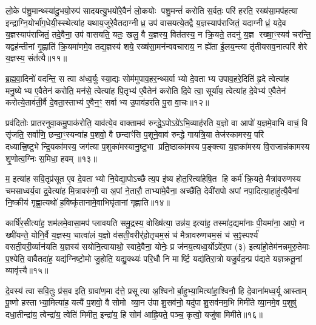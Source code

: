लो॒के प॑शु॒मान्थ्स्या॑दु॒भयो॒रुप॑ सादयत्यु॒भयो॑रे॒वैनं॑ लो॒कयोः पशु॒मन्तं॑ करोति स॒र्वतः॒ परि॑ हरति॒ रख्ष॑सा॒मप॑हत्या इन्द्राग्नि॒योर्भा॑ग॒धेयी॒स्स्थेत्या॑ह यथाय॒जुरे॒वैतदाग्नीध्र॒ उप॑ वासयत्ये॒तद्वै य॒ज्ञस्याप॑राजितं॒ यदाग्नीध्रं॒ यदे॒व य॒ज्ञस्याप॑राजितं॒ तदे॒वैना॒ उप॑ वासयति॒ यतः॒ खलु॒ वै य॒ज्ञस्य॒ वित॑तस्य॒ न क्रि॒यते॒ तदनु॑ य॒ज्ञ रख्षा॒ꣳ॒स्यव॑ चरन्ति॒ यद्वह॑न्तीनां गृ॒ह्णाति॑ क्रि॒यमा॑णमे॒व तद्य॒ज्ञस्य॑ शये॒ रख्ष॑सा॒मन॑न्ववचाराय॒ न ह्ये॑ता ई॒लय॒न्त्या तृ॑तीयसव॒नात्परि॑ शेरे य॒ज्ञस्य॒ संत॑त्यै॥११॥

{\anuvakamend[{स्या॒दिन्द्रो॑ गृह्णी॒याद॑स्त्व॒मुष्मि॑न्क्रि॒यते॒ षड्विꣳ॑शतिश्च॥२॥}]}

ब्र॒ह्म॒वा॒दिनो॑ वदन्ति॒ स त्वा अ॑ध्व॒र्युः स्या॒द्यः सोम॑मुपाव॒हर॒न्थ्सर्वाभ्यो दे॒वताभ्य उपाव॒हरे॒दिति॑ हृ॒दे त्वेत्या॑ह मनु॒ष्येभ्य ए॒वैतेन॑ करोति॒ मन॑से॒ त्वेत्या॑ह पि॒तृभ्य॑ ए॒वैतेन॑ करोति दि॒वे त्वा॒ सूर्या॑य॒ त्वेत्या॑ह दे॒वेभ्य॑ ए॒वैतेन॑ करोत्ये॒ताव॑ती॒र्वै दे॒वता॒स्ताभ्य॑ ए॒वैन॒ꣳ॒ सर्वाभ्य उ॒पाव॑हरति पु॒रा वा॒चः॥१२॥

प्रव॑दितोः प्रातरनुवा॒कमु॒पाक॑रोति॒ याव॑त्ये॒व वाक्तामव॑ रुन्द्धे॒ऽपोऽग्रे॑ऽभि॒व्याह॑रति य॒ज्ञो वा आपो॑ य॒ज्ञमे॒वाभि वाचं॒ वि सृ॑जति॒ सर्वा॑णि॒ छन्दा॒ꣳ॒स्यन्वा॑ह प॒शवो॒ वै छन्दाꣳ॑सि प॒शूने॒वाव॑ रुन्द्धे गायत्रि॒या तेज॑स्कामस्य॒ परि॑ दध्यात्त्रि॒ष्टुभेन्द्रि॒यका॑मस्य॒ जग॑त्या प॒शुका॑मस्यानु॒ष्टुभा प्रति॒ष्ठाका॑मस्य प॒ङ्क्त्या य॒ज्ञका॑मस्य वि॒राजान्न॑कामस्य शृ॒णोत्व॒ग्निः स॒मिधा॒ हवम्॥१३॥

म॒ इत्या॑ह सवि॒तृप्र॑सूत ए॒व दे॒वताभ्यो नि॒वेद्या॒पोऽच्छैत्य॒प इ॑ष्य होत॒रित्या॑हेषि॒त हि कर्म॑ क्रि॒यते॒ मैत्रा॑वरुणस्य चमसाध्वर्य॒वा द्र॒वेत्या॑ह मि॒त्रावरु॑णौ॒ वा अ॒पां ने॒तारौ॒ ताभ्या॑मे॒वैना॒ अच्छै॑ति॒ देवी॑रापो अपां नपा॒दित्या॒हाहु॑त्यै॒वैना॑ नि॒ष्क्रीय॑ गृह्णा॒त्यथो॑ ह॒विष्कृ॑तानामे॒वाभिघृ॑तानां गृह्णाति॥१४॥

कार्\mbox{}षि॑र॒सीत्या॑ह॒ शम॑लमे॒वासा॒मप॑ प्लावयति समु॒द्रस्य॒ वोख्षि॑त्या॒ उन्न॑य॒ इत्या॑ह॒ तस्मा॑द॒द्यमा॑नाः पी॒यमा॑ना॒ आपो॒ न ख्षी॑यन्ते॒ योनि॒र्वै य॒ज्ञस्य॒ चात्वा॑लं य॒ज्ञो व॑सती॒वरीर्\mbox{}॑होतृचम॒सं च॑ मैत्रावरुणचम॒सं च॑ स॒ꣵ॒स्पर्श्य॑ वसती॒वरी॒र्व्यान॑यति य॒ज्ञस्य॑ सयोनि॒त्वायाथो॒ स्वादे॒वैना॒ योनेः॒ प्र ज॑नय॒त्यध्व॒र्योऽवे॑र॒पा (३) इत्या॑हो॒तेम॑नन्नमुरु॒तेमाः प॒श्येति॒ वावैतदा॑ह॒ यद्य॑ग्निष्टो॒मो जु॒होति॒ यद्यु॒क्थ्यः॑ परि॒धौ नि मार्ष्टि॒ यद्य॑तिरा॒त्रो यजु॒र्वद॒न्प्र प॑द्यते यज्ञक्रतू॒नां व्यावृ॑त्त्यै॥१५॥

{\anuvakamend[{वा॒चो हव॑म॒भिघृ॑तानां गृह्णात्यु॒त पञ्च॑विशतिश्च॥३॥}]}

दे॒वस्य॑ त्वा सवि॒तुः प्र॑स॒व इति॒ ग्रावा॑ण॒मा द॑त्ते॒ प्रसूत्या अ॒श्विनोर्बा॒हुभ्या॒मित्या॑हा॒श्विनौ॒ हि दे॒वाना॑मध्व॒र्यू आस्ताम् पू॒ष्णो हस्ताभ्या॒मित्या॑ह॒ यत्यै॑ प॒शवो॒ वै सोमो व्या॒न उ॑पाशु॒सव॑नो॒ यदु॑पाशु॒सव॑नम॒भि मिमी॑ते व्या॒नमे॒व प॒शुषु॑ दधा॒तीन्द्रा॑य॒ त्वेन्द्रा॑य॒ त्वेति॑ मिमीत॒ इन्द्रा॑य॒ हि सोम॑ आह्रि॒यते॒ पञ्च॒ कृत्वो॒ यजु॑षा मिमीते॥१६॥

